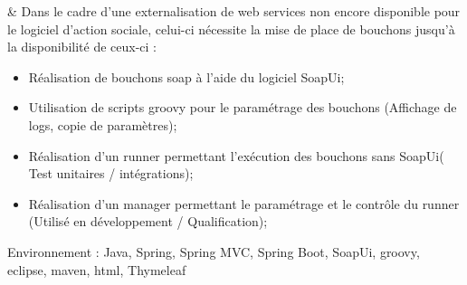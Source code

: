 
& Dans le cadre d'une externalisation de web services non encore disponible pour le logiciel d'action sociale, 
celui-ci nécessite la mise de place de bouchons jusqu'à la disponibilité de ceux-ci :
\begin{itemize}%
	\item Réalisation de bouchons soap à l'aide du logiciel SoapUi;%
	\item Utilisation de scripts groovy pour le paramétrage des bouchons (Affichage de logs, copie de paramètres);%
	\item Réalisation d'un runner permettant l'exécution des bouchons sans SoapUi( Test unitaires / intégrations);%
	\item Réalisation d'un manager permettant le paramétrage et le contrôle du runner (Utilisé en développement / Qualification);%
\end{itemize}%
Environnement : Java, Spring, Spring MVC, Spring Boot, SoapUi, groovy, eclipse, maven, html, Thymeleaf \\\\
